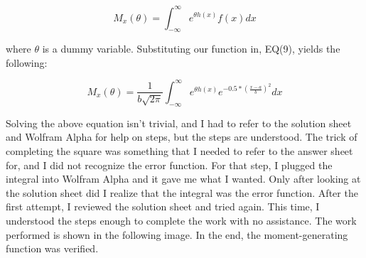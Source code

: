 \documentclass[]{article}
\begin{document}
\begin{equation}
	M_x(\theta)= \int_{-\infty}^\infty{e^{\theta h(x)} f(x)}dx
\end{equation} 

\noindent where $\theta$ is a dummy variable. Substituting our function in, EQ(9), yields the following:

\begin{displaymath}
	M_x(\theta)= \frac{1}{b\sqrt{2\pi}}\int_{-\infty}^\infty{e^{\theta h(x)}e^{-0.5*(\frac{x-a}{b})^2}}  dx
\end{displaymath} 

\noindent Solving the above equation isn't trivial, and I had to refer to the solution sheet and Wolfram Alpha for help on steps, but the steps are understood. The trick of completing the square was something that I needed to refer to the answer sheet for, and I did not recognize the error function. For that step, I plugged the integral into Wolfram Alpha and it gave me what I wanted. Only after looking at the solution sheet did I realize that the integral was the error function. After the first attempt, I reviewed the solution sheet and tried again. This time, I understood the steps enough to complete the work with no assistance. The work performed is shown in the following image. In the end, the moment-generating function was verified. 
\end{document}
